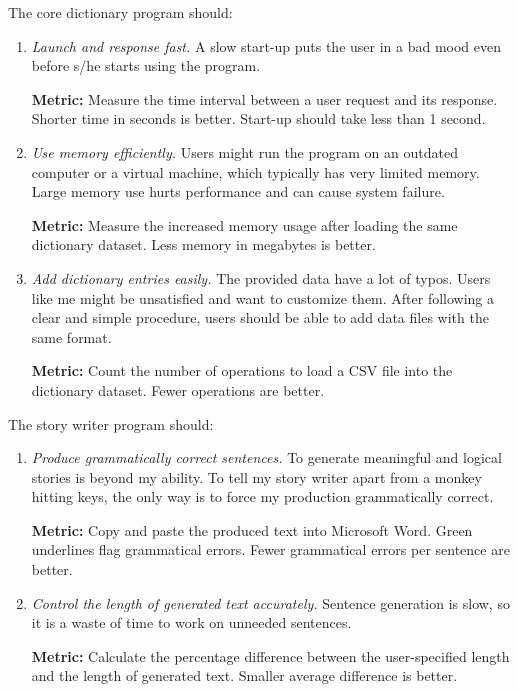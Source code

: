 \documentclass[../main.tex]{subfiles}
\begin{document}
The core dictionary program should:

\begin{enumerate}
	\item \textit{Launch and response fast.}
	A slow start-up puts the user in a bad mood even before s/he starts using the program.
	
	\textbf{Metric:} Measure the time interval between a user request and its response. Shorter time in seconds is better. Start-up should take less than 1 second.
	
	\item \textit{Use memory efficiently.}
	Users might run the program on an outdated computer or a virtual machine, which typically has very limited memory. Large memory use hurts performance and can cause system failure.
	
	\textbf{Metric:} Measure the increased memory usage after loading the same dictionary dataset. Less memory in megabytes is better.
	
	\item \textit{Add dictionary entries easily.}
	The provided data have a lot of typos. Users like me might be unsatisfied and want to customize them. After following a clear and simple procedure, users should be able to add data files with the same format.
	
	\textbf{Metric:} Count the number of operations to load a CSV file into the dictionary dataset. Fewer operations are better.
\end{enumerate}

The story writer program should:

\begin{enumerate}
	\item \textit{Produce grammatically correct sentences.}
	To generate meaningful and logical stories is beyond my ability. To tell my story writer apart from a monkey hitting keys, the only way is to force my production grammatically correct.
	
	\textbf{Metric:} Copy and paste the produced text into Microsoft Word. Green underlines flag grammatical errors. Fewer grammatical errors per sentence are better.
	
	\item \textit{Control the length of generated text accurately.}
	Sentence generation is slow, so it is a waste of time to work on unneeded sentences.
	
	\textbf{Metric:} Calculate the percentage difference between the user-specified length and the length of generated text. Smaller average difference is better.
\end{enumerate}
\end{document}
